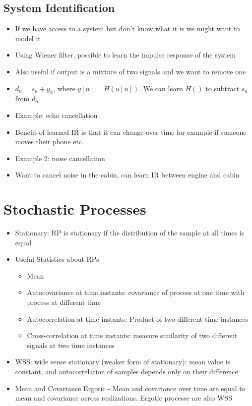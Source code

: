 \documentclass[12pt, letter]{article}
\begin{document}
\subsection*{System Identification}
\begin{itemize}
	\item If we have access to a system but don't know what it is we might want to model it
	\item Using Wiener filter, possible to learn the impulse response of the system
	\item Also useful if output is a mixture of two signals and we want to remove one
	\item $d_n = s_n + y_n$, where $y[n] = H(u[n])$. We can learn  $H()$ to subtract $s_n$ from $d_n$
	\item Example: echo cancellation
	\item Benefit of learned IR is that it can change over time for example if someone moves their phone etc.
	\item Example 2: noise cancellation
	\item Want to cancel noise in the cabin, can learn IR between engine and cabin
\end{itemize}

\section{Stochastic Processes}%
\label{sec:stochastic_processes}
\begin{itemize}
	\item Stationary: RP is stationary if the distribution of the sample at all times is equal
	\item Useful Statistics about RPs
	\begin{itemize}
		\item Mean
		\item Autocovariance at time instants: covariance of process at one time with process at different time
		\item Autocorrelation at time instants: Product of two different time instances
		\item Cross-correlation at time instants: measure similarity of two different signals at two time instances
	\end{itemize}
	\item WSS: wide sense stationary (weaker form of stationary): mean value is constant, and autocorrelation of samples depends only on their difference
	\item Mean and Covariance Ergotic - Mean and covariance over time are equal to mean and covariance across realizations. Ergotic processe are also WSS
\end{itemize}
\end{document}
